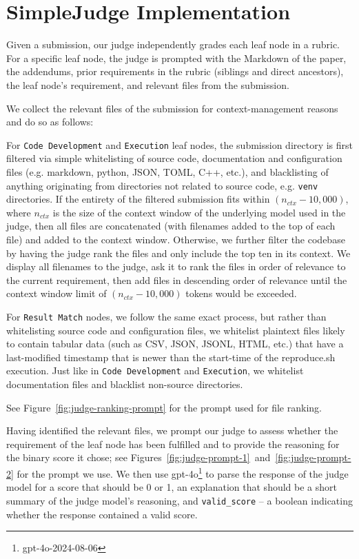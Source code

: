 \documentclass{article}
\theoremstyle{plain}
\theoremstyle{definition}
\theoremstyle{remark}
\begin{document}
\section{SimpleJudge Implementation}
\label{app:judge-implementation}

Given a submission, our judge independently grades each leaf node in a rubric. For a specific leaf node, the judge is prompted with the Markdown of the paper, the addendums, prior requirements in the rubric (siblings and direct ancestors), the leaf node's requirement, and relevant files from the submission.

We collect the relevant files of the submission for context-management reasons and do so as follows: 

For \texttt{Code Development} and \texttt{Execution} leaf nodes, the submission directory is first filtered via simple whitelisting of source code, documentation and configuration files (e.g. markdown, python, JSON, TOML, C++, etc.), and blacklisting of anything originating from directories not related to source code, e.g. \texttt{venv} directories. If the entirety of the filtered submission fits within $(n_{ctx}-10,000)$, where $n_{ctx}$ is the size of the context window of the underlying model used in the judge, then all files are concatenated (with filenames added to the top of each file) and added to the context window. Otherwise, we further filter the codebase by having the judge rank the files and only include the top ten in its context. We display all filenames to the judge, ask it to rank the files in order of relevance to the current requirement, then add files in descending order of relevance until the context window limit of $(n_{ctx}-10,000)$ tokens would be exceeded. 

For \texttt{Result Match} nodes, we follow the same exact process, but rather than whitelisting source code and configuration files, we whitelist plaintext files likely to contain tabular data (such as CSV, JSON, JSONL, HTML, etc.) that have a last-modified timestamp that is newer than the start-time of the reproduce.sh execution. Just like in \texttt{Code Development} and \texttt{Execution}, we whitelist documentation files and blacklist non-source directories.

See Figure~\ref{fig:judge-ranking-prompt} for the prompt used for file ranking.

Having identified the relevant files, we prompt our judge to assess whether the requirement of the leaf node has been fulfilled and to provide the reasoning for the binary score it chose; see Figures~\ref{fig:judge-prompt-1}~and~\ref{fig:judge-prompt-2} for the prompt we use. We then use gpt-4o\footnote{gpt-4o-2024-08-06} to parse the response of the judge model for a score that should be 0 or 1, an explanation that should be a short summary of the judge model’s reasoning, and \texttt{valid\_score} -- a boolean indicating whether the response contained a valid score.
\end{document}
